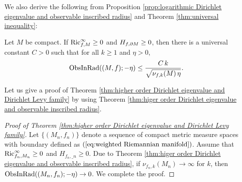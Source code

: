 We also derive the following from Proposition \ref{prop:logarithmic Dirichlet eigenvalue and observable inscribed radius} and Theorem \ref{thm:universal inequality}:
\begin{thm}\label{thm:higer order Dirichlet eigenvalue and observable inscribed radius}
Let $M$ be compact.
If $\operatorname{Ric}^{\infty}_{f,M}\geq 0$ and $H_{f,\partial M}\geq 0$,
then there is a universal constant $C>0$ such that
for all $k\geq 1$ and $\eta>0$,
\begin{equation*}
\operatorname{ObsInRad}((M,f);-\eta)\leq \frac{C\,k}{\sqrt{\nu_{f,k}(M)\, \eta}}.
\end{equation*}
\end{thm}

Let us give a proof of Theorem \ref{thm:higher order Dirichlet eigenvalue and Dirichlet Levy family} by using Theorem \ref{thm:higer order Dirichlet eigenvalue and observable inscribed radius}.
\begin{proof}[Proof of Theorem \ref{thm:higher order Dirichlet eigenvalue and Dirichlet Levy family}]
Let $\{(M_{n},f_{n})\}$ denote a sequence of compact metric measure spaces with boundary defined as $(\ref{eq:weighted Riemannian manifold})$.
Assume that
$\operatorname{Ric}^{\infty}_{f_{n},M_{n}}\geq 0$ and $H_{f_{n},\bm_{n}}\geq 0$.
Due to Theorem \ref{thm:higer order Dirichlet eigenvalue and observable inscribed radius},
if $\nu_{f_{n},k}(M_{n})\to \infty$ for $k$,
then $\operatorname{ObsInRad}((M_{n},f_{n});-\eta)\to 0$.
We complete the proof.
\end{proof}

